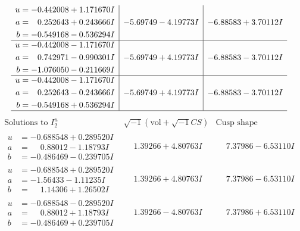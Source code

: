 \documentclass[1p]{elsarticle_modified}
\theoremstyle{definition}
\newcommand{\I}{\sqrt{-1}}
\begin{document}
$$\begin{array}{c|c|c}
\begin{aligned}
u &= -0.442008 + 1.171670 I \\
a &= \phantom{-}0.252643 + 0.243666 I \\
b &= -0.549168 - 0.536294 I\end{aligned}
 & -5.69749 - 4.19773 I & -6.88583 + 3.70112 I \\ \hline\begin{aligned}
u &= -0.442008 - 1.171670 I \\
a &= \phantom{-}0.742971 - 0.990301 I \\
b &= -1.076050 - 0.211669 I\end{aligned}
 & -5.69749 + 4.19773 I & -6.88583 - 3.70112 I \\ \hline\begin{aligned}
u &= -0.442008 - 1.171670 I \\
a &= \phantom{-}0.252643 - 0.243666 I \\
b &= -0.549168 + 0.536294 I\end{aligned}
 & -5.69749 + 4.19773 I & -6.88583 - 3.70112 I\\
 \hline 
 \end{array}$$\newpage$$\begin{array}{c|c|c}  
\text{Solutions to }I^u_{2}& \I (\text{vol} + \sqrt{-1}CS) & \text{Cusp shape}\\
 \hline 
\begin{aligned}
u &= -0.688548 + 0.289520 I \\
a &= \phantom{-}0.88012 - 1.18793 I \\
b &= -0.486469 - 0.239705 I\end{aligned}
 & \phantom{-}1.39266 + 4.80763 I & \phantom{-}7.37986 - 6.53110 I \\ \hline\begin{aligned}
u &= -0.688548 + 0.289520 I \\
a &= -1.56433 - 1.11235 I \\
b &= \phantom{-}1.14306 + 1.26502 I\end{aligned}
 & \phantom{-}1.39266 + 4.80763 I & \phantom{-}7.37986 - 6.53110 I \\ \hline\begin{aligned}
u &= -0.688548 - 0.289520 I \\
a &= \phantom{-}0.88012 + 1.18793 I \\
b &= -0.486469 + 0.239705 I\end{aligned}
 & \phantom{-}1.39266 - 4.80763 I & \phantom{-}7.37986 + 6.53110 I \\ \hline\begin{aligned}

\end{aligned}
\end{array}$$
\end{document}
